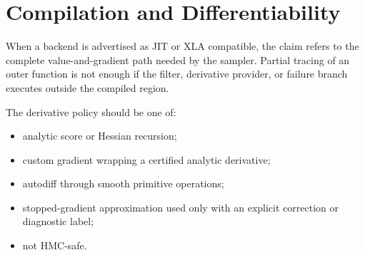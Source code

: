 \section{Compilation and Differentiability}
\label{sec:bf-hmc-target-compilation}

When a backend is advertised as JIT or XLA compatible, the claim refers to the
complete value-and-gradient path needed by the sampler.  Partial tracing of an
outer function is not enough if the filter, derivative provider, or failure
branch executes outside the compiled region.

The derivative policy should be one of:
\begin{itemize}
  \item analytic score or Hessian recursion;
  \item custom gradient wrapping a certified analytic derivative;
  \item autodiff through smooth primitive operations;
  \item stopped-gradient approximation used only with an explicit correction or
    diagnostic label;
  \item not HMC-safe.
\end{itemize}

